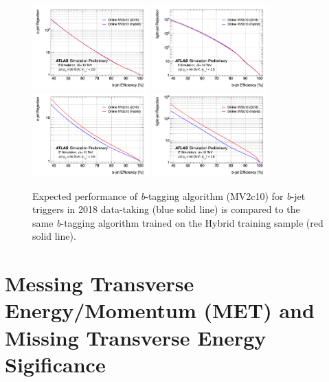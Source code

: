 \begin{figure}[htbp]
 \begin{center}
 \includegraphics[width=0.4\textwidth]{chapters/c5/figures/ROC_cb}
 \includegraphics[width=0.4\textwidth]{chapters/c5/figures/ROC_lb}
 \includegraphics[width=0.4\textwidth]{chapters/c5/figures/ROC_cb_Zprime}
 \includegraphics[width=0.4\textwidth]{chapters/c5/figures/ROC_lb_Zprime}
 \end{center}
 \caption{Expected performance of \textit{b}-tagging algorithm (MV2c10) for \textit{b}-jet triggers in 2018 data-taking (blue solid line) is compared to the same \textit{b}-tagging algorithm trained on the Hybrid training sample (red solid line).}
 \label{fig:mv2c10}
\end{figure}

\section{Messing Transverse Energy/Momentum (MET) and Missing Transverse Energy Sigificance}

